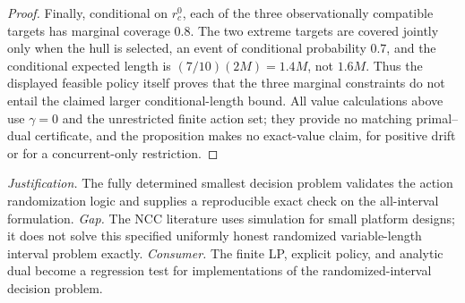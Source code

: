 \documentclass{article}
\begin{document}
\begin{proof}
Finally, conditional on \(r_c^0\), each of the three observationally compatible targets has marginal coverage \(0.8\).  The two extreme targets are covered jointly only when the hull is selected, an event of conditional probability \(0.7\), and the conditional expected length is \((7/10)(2M)=1.4M\), not \(1.6M\).  Thus the displayed feasible policy itself proves that the three marginal constraints do not entail the claimed larger conditional-length bound.  All value calculations above use \(\gamma=0\) and the unrestricted finite action set; they provide no matching primal--dual certificate, and the proposition makes no exact-value claim, for positive drift or for a concurrent-only restriction.
\end{proof}
\par\smallskip\noindent \textit{Justification.} The fully determined smallest decision problem validates the action randomization logic and supplies a reproducible exact check on the all-interval formulation. \textit{Gap.} The NCC literature uses simulation for small platform designs; it does not solve this specified uniformly honest randomized variable-length interval problem exactly. \textit{Consumer.} The finite LP, explicit policy, and analytic dual become a regression test for implementations of the randomized-interval decision problem.
\end{document}
